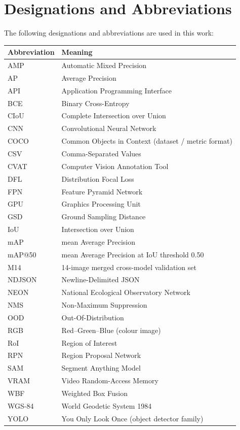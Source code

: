 \chapter*{Designations and Abbreviations}

The following designations and abbreviations are used in this work:

{\def\LTcaptype{none} %
\begin{longtable}[]{@{}ll@{}}
\toprule\noalign{}
Abbreviation & Meaning \\
\midrule\noalign{}
\endhead
\bottomrule\noalign{}
\endlastfoot
AMP & Automatic Mixed Precision \\
AP & Average Precision \\
API & Application Programming Interface \\
BCE & Binary Cross-Entropy \\
CIoU & Complete Intersection over Union \\
CNN & Convolutional Neural Network \\
COCO & Common Objects in Context (dataset / metric format) \\
CSV & Comma-Separated Values \\
CVAT & Computer Vision Annotation Tool \\
DFL & Distribution Focal Loss \\
FPN & Feature Pyramid Network \\
GPU & Graphics Processing Unit \\
GSD & Ground Sampling Distance \\
IoU & Intersection over Union \\
mAP & mean Average Precision \\
mAP@50 & mean Average Precision at IoU threshold 0.50 \\
M14 & 14-image merged cross-model validation set \\
NDJSON & Newline-Delimited JSON \\
NEON & National Ecological Observatory Network \\
NMS & Non-Maximum Suppression \\
OOD & Out-Of-Distribution \\
RGB & Red--Green--Blue (colour image) \\
RoI & Region of Interest \\
RPN & Region Proposal Network \\
SAM & Segment Anything Model \\
VRAM & Video Random-Access Memory \\
WBF & Weighted Box Fusion \\
WGS-84 & World Geodetic System 1984 \\
YOLO & You Only Look Once (object detector family) \\
\end{longtable}
}
